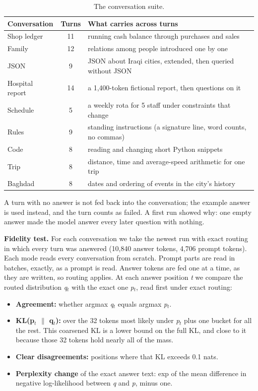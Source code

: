 \begin{table}[t]
\centering\small
\caption{The conversation suite.}\label{tab:suite}
\begin{tabular}{lcl}
\toprule
Conversation & Turns & What carries across turns \\
\midrule
Shop ledger & 11 & running cash balance through purchases and sales \\
Family & 12 & relations among people introduced one by one \\
JSON & 9 & JSON about Iraqi cities, extended, then queried without JSON \\
Hospital report & 14 & a 1,400-token fictional report, then questions on it \\
Schedule & 5 & a weekly rota for 5 staff under constraints that change \\
Rules & 9 & standing instructions (a signature line, word counts, no commas) \\
Code & 8 & reading and changing short Python snippets \\
Trip & 8 & distance, time and average-speed arithmetic for one trip \\
Baghdad & 8 & dates and ordering of events in the city's history \\
\bottomrule
\end{tabular}
\end{table}

A turn with no answer is not fed back into the conversation; the example answer is used instead, and the turn counts as failed. A first run showed why: one empty answer made the model answer every later question with nothing.

\textbf{Fidelity test.} For each conversation we take the newest run with exact routing in which every turn was answered (10,840 answer tokens, 4,706 prompt tokens). Each mode reads every conversation from scratch. Prompt parts are read in batches, exactly, as a prompt is read. Answer tokens are fed one at a time, as they are written, so routing applies. At each answer position \emph{t} we compare the routed distribution \emph{q}$_t$ with the exact one \emph{p}$_t$, read first under exact routing:

\begin{itemize}
  \item \textbf{Agreement:} whether argmax \emph{q}$_t$ equals argmax \emph{p}$_t$.
  \item \textbf{KL(p$_t$ $\|$ q$_t$):} over the 32 tokens most likely under \emph{p}$_t$ plus one bucket for all the rest. This coarsened KL is a lower bound on the full KL, and close to it because those 32 tokens hold nearly all of the mass.
  \item \textbf{Clear disagreements:} positions where that KL exceeds 0.1 nats.
  \item \textbf{Perplexity change} of the exact answer text: exp of the mean difference in negative log-likelihood between \emph{q} and \emph{p}, minus one.
\end{itemize}

